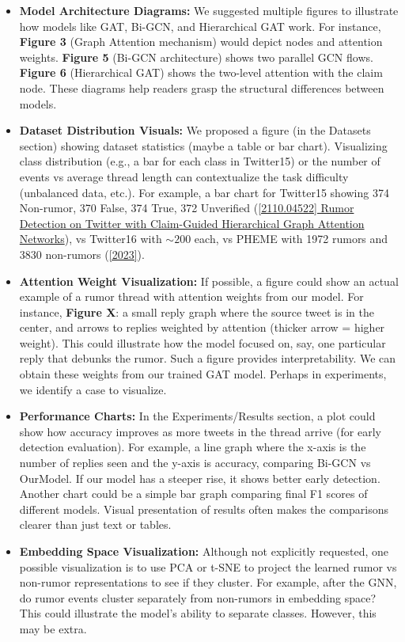 \documentclass[12pt,a4paper]{report}
\begin{document}
\begin{itemize}[leftmargin=1.2cm]
    \item \textbf{Model Architecture Diagrams:} We suggested multiple figures to illustrate how models like GAT, Bi-GCN, and Hierarchical GAT work. For instance, \textbf{Figure 3} (Graph Attention mechanism) would depict nodes and attention weights. \textbf{Figure 5} (Bi-GCN architecture) shows two parallel GCN flows. \textbf{Figure 6} (Hierarchical GAT) shows the two-level attention with the claim node. These diagrams help readers grasp the structural differences between models.
    \item \textbf{Dataset Distribution Visuals:} We proposed a figure (in the Datasets section) showing dataset statistics (maybe a table or bar chart). Visualizing class distribution (e.g., a bar for each class in Twitter15) or the number of events vs average thread length can contextualize the task difficulty (unbalanced data, etc.). For example, a bar chart for Twitter15 showing 374 Non-rumor, 370 False, 374 True, 372 Unverified (\href{https://ar5iv.org/pdf/2110.04522#:~:text=real,rumor.%20To%20evaluate}{[2110.04522] Rumor Detection on Twitter with Claim-Guided Hierarchical Graph Attention Networks}), vs Twitter16 with \(\sim200\) each, vs PHEME with 1972 rumors and 3830 non-rumors (\href{https://aclanthology.org/2023.findings-eacl.55.pdf#:~:text=PHEME%3A%20This%20benchmark%20contains%205%2C802,Rumor%20%28Zubiaga%20et%20al.%2C%202016}{[2023]}).
    \item \textbf{Attention Weight Visualization:} If possible, a figure could show an actual example of a rumor thread with attention weights from our model. For instance, \textbf{Figure X}: a small reply graph where the source tweet is in the center, and arrows to replies weighted by attention (thicker arrow = higher weight). This could illustrate how the model focused on, say, one particular reply that debunks the rumor. Such a figure provides interpretability. We can obtain these weights from our trained GAT model. Perhaps in experiments, we identify a case to visualize.
    \item \textbf{Performance Charts:} In the Experiments/Results section, a plot could show how accuracy improves as more tweets in the thread arrive (for early detection evaluation). For example, a line graph where the x-axis is the number of replies seen and the y-axis is accuracy, comparing Bi-GCN vs OurModel. If our model has a steeper rise, it shows better early detection. Another chart could be a simple bar graph comparing final F1 scores of different models. Visual presentation of results often makes the comparisons clearer than just text or tables.
    \item \textbf{Embedding Space Visualization:} Although not explicitly requested, one possible visualization is to use PCA or t-SNE to project the learned rumor vs non-rumor representations to see if they cluster. For example, after the GNN, do rumor events cluster separately from non-rumors in embedding space? This could illustrate the model’s ability to separate classes. However, this may be extra.
\end{itemize}
\end{document}
